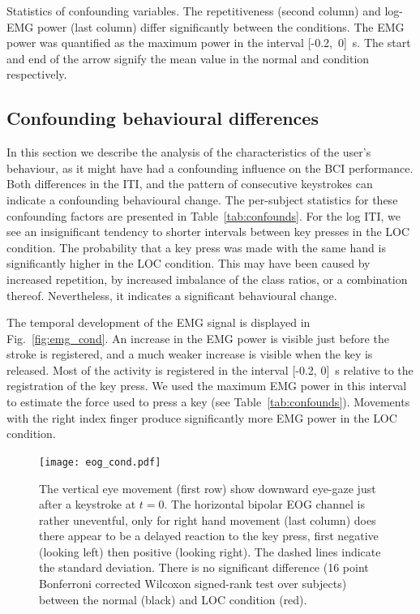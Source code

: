 \begin{table}
  \caption{Statistics of confounding variables. The repetitiveness (second
  column) and log-\protect\ac{EMG} power (last column) differ significantly
  between the conditions. The \protect\ac{EMG} power was quantified as the
  maximum power in the interval [-0.2,~0]~s. The start and end of the arrow
  signify the mean value in the normal and  condition
  respectively.} 
  \center \footnotesize
  
  \label{tab:confounds} 
\end{table}

\subsection{Confounding behavioural differences} \label{sec:behav} 
In this section we describe the analysis of the characteristics of the user's
behaviour, as it might have had a confounding influence on the \ac{BCI}
performance. 
%
Both differences in the \ac{ITI}, and the pattern of consecutive keystrokes
can indicate a confounding behavioural change. The per-subject statistics for
these confounding factors are presented in Table~\ref{tab:confounds}. For the
log \ac{ITI}, we see an insignificant tendency to shorter intervals between key
presses in the \ac{LOC} condition. The probability that a key press was made
with the same hand is significantly higher in the \ac{LOC} condition. This may have been caused by increased repetition, by increased imbalance of the class ratios,
or a combination thereof. Nevertheless, it indicates a significant behavioural
change.

The temporal development of the \ac{EMG} signal is displayed in
Fig.~\ref{fig:emg_cond}. An increase in the \ac{EMG} power is visible just
before the stroke is registered, and a much weaker increase is visible when the
key is released. Most of the activity is registered in the interval [-0.2, 0]~s
relative to the registration of the key press. We used the maximum \ac{EMG}
power in this interval to estimate the force used to press a key (see
Table~\ref{tab:confounds}). Movements with the right index finger produce
significantly more \ac{EMG} power in the \ac{LOC} condition.

\begin{figure}
  \center
  \texttt{[image: eog\_cond.pdf]}
  \caption{The vertical eye movement (first row) show downward eye-gaze just
  after a keystroke at $t=0$. The horizontal bipolar \protect\ac{EOG} channel
  is rather uneventful, only for right hand movement (last column) does there
  appear to be a delayed reaction to the key press, first negative (looking
  left) then positive (looking right). The dashed lines indicate the standard
  deviation.  There is no significant difference (16 point Bonferroni corrected
  Wilcoxon signed-rank test over subjects) between the normal (black) and
  \protect\ac{LOC} condition (red).}
  \label{fig:eog_cond}
\end{figure}

